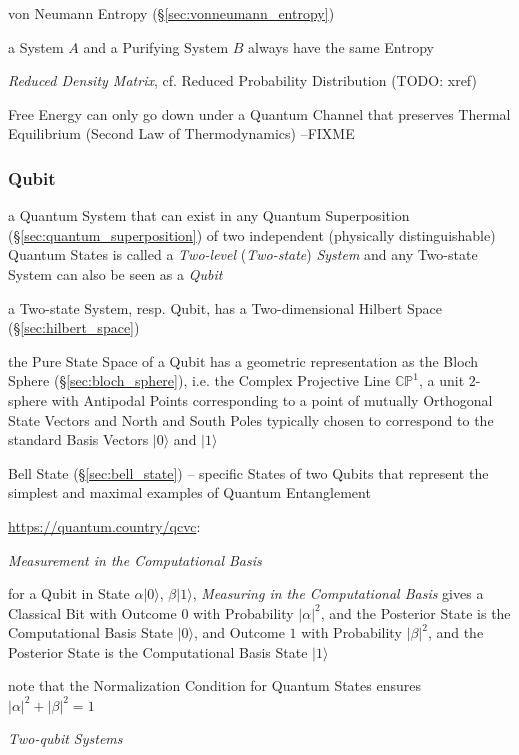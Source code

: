 von Neumann Entropy (\S\ref{sec:vonneumann_entropy})

a System $A$ and a Purifying System $B$ always have the same Entropy

\emph{Reduced Density Matrix}, cf. Reduced Probability Distribution (TODO: xref)

Free Energy can only go down under a Quantum Channel that preserves Thermal
Equilibrium (Second Law of Thermodynamics)
--FIXME



\subsubsection{Qubit}\label{sec:qubit}

a Quantum System that can exist in any Quantum Superposition
(\S\ref{sec:quantum_superposition}) of two independent (physically
distinguishable) Quantum States is called a \emph{Two-level} (\emph{Two-state})
\emph{System} and any Two-state System can also be seen as a \emph{Qubit}

a Two-state System, resp. Qubit, has a Two-dimensional Hilbert Space
(\S\ref{sec:hilbert_space})

the Pure State Space of a Qubit has a geometric representation as the Bloch
Sphere (\S\ref{sec:bloch_sphere}), i.e. the Complex Projective Line
$\mathbb{CP}^1$, a unit $2$-sphere with Antipodal Points corresponding to a
point of mutually Orthogonal State Vectors and North and South Poles typically
chosen to correspond to the standard Basis Vectors $|0\rangle$ and $|1\rangle$

\fist Bell State (\S\ref{sec:bell_state}) -- specific States of two Qubits that
represent the simplest and maximal examples of Quantum Entanglement

\url{https://quantum.country/qcvc}:

\emph{Measurement in the Computational Basis}

for a Qubit in State $\alpha|0\rangle$, $\beta|1\rangle$, \emph{Measuring in the
  Computational Basis} gives a Classical Bit with Outcome $0$ with Probability
$|\alpha|^2$, and the Posterior State is the Computational Basis State
$|0\rangle$, and Outcome $1$ with Probability $|\beta|^2$, and the Posterior
State is the Computational Basis State $|1\rangle$

note that the Normalization Condition for Quantum States ensures
$|\alpha|^2 + |\beta|^2 = 1$

\emph{Two-qubit Systems}

